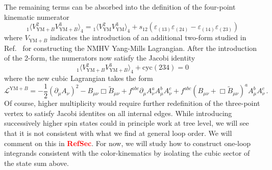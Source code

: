 \documentclass[11pt,letter]{article}
\def\be{\begin{equation}}
\def\ee{\end{equation}}
\newcommand{\sect}{\textbf{\textcolor{red}{RefSec}}}
\begin{document}
The remaining terms can be absorbed into the definition of the
four-point kinematic numerator
\begin{equation}
{}_1\langle V^{2}_{\text{YM}+B}V^{3}_{\text{YM}+B}\rangle_4 = {}_1\langle V^{2}_{\text{YM}}V^{3}_{\text{YM}}\rangle_4 + s_{12} (\varepsilon_{(13)}\varepsilon_{(24)}-\varepsilon_{(14)}\varepsilon_{(23)})
\end{equation}
where $V_{\text{YM}+B}$ indicates the introduction of an additional
two-form studied in Ref.~\cite{Ben-Shahar:2022ixa} for constructing the
NMHV Yang-Mills Lagrangian.  After the introduction of the 2-form, the
numerators now satisfy the Jacobi identity \be {}_1\langle
V^{2}_{\text{YM}+B}V^{3}_{\text{YM}+B}\rangle_4+\text{cyc}(234) =0 \ee
where the new cubic Lagrangian takes the form \be
\mathcal{L}^{\text{YM}+B} = -\frac{1}{2}(\partial_\mu A_\nu)^2 -
B_{\mu\nu}\Box\tilde{B}_{\mu\nu}+ f^{abc} \partial_\mu A^a_\nu A^b_\mu
A^c_\nu+ f^{abc} (B_{\mu\nu}+\Box \tilde{B}_{\mu\nu})^a A^b_\mu
A^c_\nu\, .  \ee Of course, higher multiplicity would require further
redefinition of the three-point vertex to satisfy Jacobi identites on
all internal edges. While introducing successively higher spin states
could in principle work at tree level, we will see that it is not
consistent with what we find at general loop order. We will comment on
this in \sect{}. For now, we will study how to construct one-loop
integrands consistent with the color-kinematics by isolating the cubic
sector of the state sum above.
\end{document}
